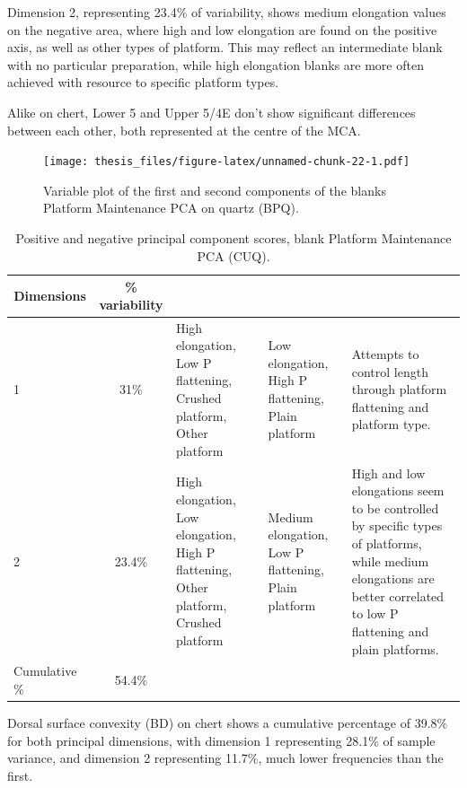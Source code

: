 \documentclass[12pt,twoside]{reedthesis}
\begin{document}
Dimension 2, representing 23.4\% of variability, shows medium elongation values on the negative area, where high and low elongation are found on the positive axis, as well as other types of platform. This may reflect an intermediate blank with no particular preparation, while high elongation blanks are more often achieved with resource to specific platform types.

Alike on chert, Lower 5 and Upper 5/4E don't show significant differences between each other, both represented at the centre of the MCA.
\begin{figure}
\centering
\texttt{[image: thesis\_files/figure-latex/unnamed-chunk-22-1.pdf]}
\caption{\label{fig:unnamed-chunk-22}Variable plot of the first and second components of the blanks Platform Maintenance PCA on quartz (BPQ).}
\end{figure}
\begin{table}[!h]

\caption{\label{tab:unnamed-chunk-23}Positive and negative principal component scores, blank Platform Maintenance PCA (CUQ).}
\centering
\begin{tabular}[t]{lc>{\raggedright\arraybackslash}p{3cm}>{\raggedright\arraybackslash}p{3cm}>{\raggedright\arraybackslash}p{3cm}}
\toprule
\multicolumn{1}{c}{\textbf{Dimensions}} & \multicolumn{1}{c}{\textbf{\% variability}} & \multicolumn{1}{>{\centering\arraybackslash}p{3cm}}{\textbf{+}} & \multicolumn{1}{>{\centering\arraybackslash}p{3cm}}{\textbf{-}} & \multicolumn{1}{>{\centering\arraybackslash}p{3cm}}{\textbf{Interpretation}}\\
\midrule
1 & 31\% & High elongation, Low P flattening, Crushed platform, Other platform & Low elongation, High P flattening, Plain platform & Attempts to control length through platform flattening and platform type.\\
2 & 23.4\% & High elongation, Low elongation, High P flattening, Other platform, Crushed platform & Medium elongation, Low P flattening, Plain platform & High and low elongations seem to be controlled by specific types of platforms, while medium elongations are better correlated to low P flattening and plain platforms.\\
Cumulative \% & 54.4\% &  &  & \\
\bottomrule
\end{tabular}
\end{table}
Dorsal surface convexity (BD) on chert shows a cumulative percentage of 39.8\% for both principal dimensions, with dimension 1 representing 28.1\% of sample variance, and dimension 2 representing 11.7\%, much lower frequencies than the first.
\end{document}
